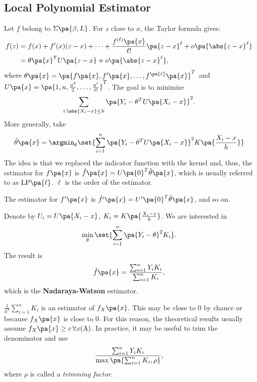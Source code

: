 \subsection{Local Polynomial Estimator}
Let $f$ belong to $\Sigma\pa{\beta,L}$. For $z$ close to $x$, the Taylor formula gives:
\begin{equation}
\begin{split}
 f(z)&=f(x)+f'(x)(z-x)+\cdots +\frac{f^{(\ell)}\pa{x}}{\ell !}\pa{z-x}^\ell +o\pa{\abs{z-x}^\ell}\\
 &= \theta\pa{x}^T U\pa{z-x} + o\pa{\abs{z-x}^\ell},
\end{split}
\end{equation}
where $\theta\pa{x} = \pa{f\pa{x},f'\pa{x},\ldots, f^{\pa{\ell}}\pa{x}}^T$ and $U\pa{x} = \pa{1,u,\frac{u^2}{2},\ldots, \frac{u^\ell}{\ell !}}^T$. The goal is to minimize
\begin{equation}
  \sum_{i:\abs{X_i -x}\leq h} \pa{Y_i - \theta^T U\pa{X_i - x}}^2.
\end{equation}
More generally, take \begin{equation}
\hat\theta \pa{x} = \argmin_\theta \set{ \sum_{i=1}^n \pa{Y_i - \theta^T U\pa{X_i-x}}^2 K\pa{\frac{X_i-x}{h}} }
\end{equation}
The idea is that we replaced the indicator function with the kernel and, thus, the estimator for $f\pa{x}$ is $\hat{f}\pa{x}=U\pa{0}^T\hat{\theta}\pa{x}$, which is usually referred to as $\mathrm{LP}\pa{\ell}$. $\ell$ is the order of the estimator.

The estimator for $f'\pa{x}$ is $\hat{f'}\pa{x} = U'\pa{0}^T \hat{\theta}\pa{x}$, and so on.

\begin{example}
Denote by $U_i=U\pa{X_i-x}$, $K_i=K\pa{\frac{X_i-x}{h}}$. We are interested in
\begin{equation}
  \min_\theta \set{\sum_{i=1}^n \pa{Y_i - \theta }^2 K_i}.
\end{equation}
The result is
\begin{equation}
  \hat{f}\pa{x} = \frac{\sum_{i=1}^n Y_i K_i}{\sum_{i=1}^n K_i},
\end{equation} which is the \textbf{Nadaraya-Watson} estimator.
\end{example}

$\frac{1}{h^n}\sum_{i=1}^n K_i$ is an estimator of $f_X\pa{x}$. This may be close to $0$ by chance or because $f_X\pa{x}$ is close to $0$.
For this reason, the theoretical results usually assume $f_X\pa{x}\geq c\,\forall x \mathrm{(A)}$.
In practice, it may be useful to trim the denominator and use
\begin{equation}
  \frac{\sum_{i=1}^n Y_i K_i}{\max\pa{\sum_{i=1}^n K_i, \rho}},
\end{equation}
where $\rho$ is called a \textit{trimming factor}.


